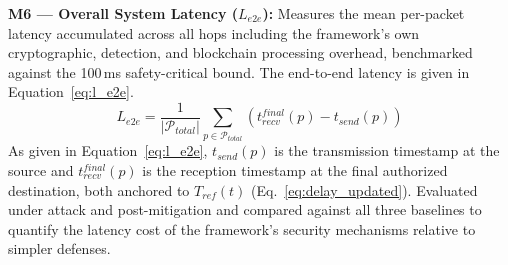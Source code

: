 \documentclass[12pt, a4paper]{report}
\begin{document}
{{%

\textbf{M6 — Overall System Latency ($L_{e2e}$):}
Measures the mean per-packet latency accumulated
across all hops including the framework's own
cryptographic, detection, and blockchain processing
overhead, benchmarked against the 100\,ms
safety-critical bound. The end-to-end latency is
given in Equation~\eqref{eq:l_e2e}.
\begin{equation}
L_{e2e} =
\frac{1}{|\mathcal{P}_{total}|}
\sum_{p \in \mathcal{P}_{total}}
\left(
t_{recv}^{final}(p) - t_{send}(p)
\right)
\label{eq:l_e2e}
\end{equation}
As given in Equation~\eqref{eq:l_e2e},
$t_{send}(p)$ is the transmission timestamp at the
source and $t_{recv}^{final}(p)$ is the reception
timestamp at the final authorized destination,
both anchored to $T_{ref}(t)$
(Eq.~\ref{eq:delay_updated}). Evaluated under
attack and post-mitigation and compared against
all three baselines to quantify the latency cost
of the framework's security mechanisms relative
to simpler defenses.



}}
\end{document}
